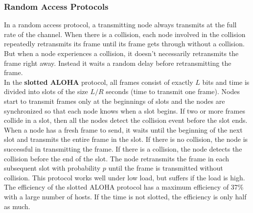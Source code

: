 \subsubsection{Random Access Protocols}
In a random access protocol, a transmitting node always transmits at the full rate of the channel. When there is a collision, each node involved in the collision repeatedly retransmits its frame until its frame gets through without a collision. But when a node experiences a collision, it doesn't necessarily retransmits the frame right away. Instead it waits a random delay before retransmitting the frame. \vspace{.3cm}\\
In the \textbf{slotted ALOHA} protocol, all frames consist of exactly $L$ bits and time is divided into slots of the size $L/R$ seconds (time to transmit one frame). Nodes start to transmit frames only at the beginnings of slots and the nodes are synchronized so that each node knows when a slot begins. If two or more frames collide in a slot, then all the nodes detect the collision event before the slot ends. When a node has a fresh frame to send, it waits until the beginning of the next slot and transmits the entire frame in the slot. If there is no collision, the node is successful in transmitting the frame. If there is a collision, the node detects the collision before the end of the slot. The node retransmits the frame in each subsequent slot with probability $p$ until the frame is transmitted without collision.
This protocol works well under low load, but suffers if the load is high. The efficiency of the slotted ALOHA protocol has a maximum efficiency of 37\% with a large number of hosts. If the time is not slotted, the efficiency is only half as much.\vspace{.3cm}\\

